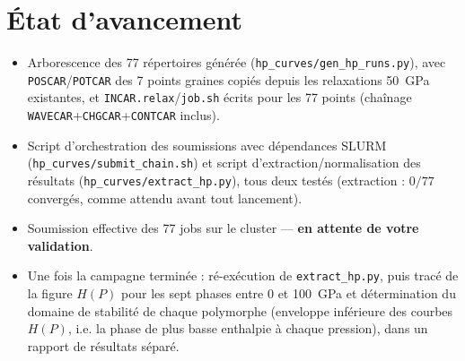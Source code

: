 \documentclass[11pt,a4paper]{article}
\begin{document}
\section{État d'avancement}

\begin{itemize}
  \item[\textbf{Fait}] Arborescence des 77 répertoires générée
  (\texttt{hp\_curves/gen\_hp\_runs.py}), avec \texttt{POSCAR}/\texttt{POTCAR} des 7 points
  graines copiés depuis les relaxations 50~GPa existantes, et \texttt{INCAR.relax}/\texttt{job.sh}
  écrits pour les 77 points (chaînage \texttt{WAVECAR}+\texttt{CHGCAR}+\texttt{CONTCAR} inclus).
  \item[\textbf{Fait}] Script d'orchestration des soumissions avec dépendances SLURM
  (\texttt{hp\_curves/submit\_chain.sh}) et script d'extraction/normalisation des résultats
  (\texttt{hp\_curves/extract\_hp.py}), tous deux testés (extraction : $0/77$ convergés, comme
  attendu avant tout lancement).
  \item[\textbf{En attente}] Soumission effective des 77 jobs sur le cluster —
  \textbf{en attente de votre validation}.
  \item[\textbf{À venir}] Une fois la campagne terminée : ré-exécution de
  \texttt{extract\_hp.py}, puis tracé de la figure $H(P)$ pour les sept phases entre 0 et
  100~GPa et détermination du domaine de stabilité de chaque polymorphe (enveloppe inférieure
  des courbes $H(P)$, i.e. la phase de plus basse enthalpie à chaque pression), dans un rapport
  de résultats séparé.
\end{itemize}
\end{document}
